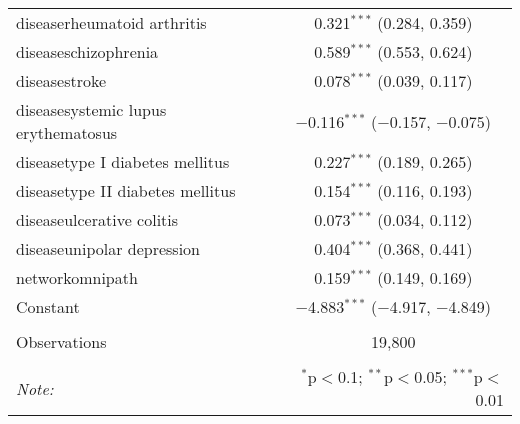 \begin{table}[!htbp]
\begin{tabular}{@{\extracolsep{5pt}}lc}
  diseaserheumatoid arthritis & 0.321$^{***}$ (0.284, 0.359) \\ 
  diseaseschizophrenia & 0.589$^{***}$ (0.553, 0.624) \\ 
  diseasestroke & 0.078$^{***}$ (0.039, 0.117) \\ 
  diseasesystemic lupus erythematosus & $-$0.116$^{***}$ ($-$0.157, $-$0.075) \\ 
  diseasetype I diabetes mellitus & 0.227$^{***}$ (0.189, 0.265) \\ 
  diseasetype II diabetes mellitus & 0.154$^{***}$ (0.116, 0.193) \\ 
  diseaseulcerative colitis & 0.073$^{***}$ (0.034, 0.112) \\ 
  diseaseunipolar depression & 0.404$^{***}$ (0.368, 0.441) \\ 
  networkomnipath & 0.159$^{***}$ (0.149, 0.169) \\ 
  Constant & $-$4.883$^{***}$ ($-$4.917, $-$4.849) \\ 
 \hline \\[-1.8ex] 
Observations & 19,800 \\ 
\hline 
\hline \\[-1.8ex] 
\textit{Note:}  & \multicolumn{1}{r}{$^{*}$p$<$0.1; $^{**}$p$<$0.05; $^{***}$p$<$0.01} \\ 
\end{tabular} 
\end{table} 
